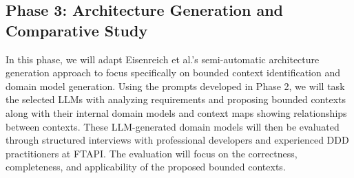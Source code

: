 \documentclass[12pt,a4paper]{article}
\begin{document}
\subsection{Phase 3: Architecture Generation and Comparative Study}
In this phase, we will adapt Eisenreich et al.'s semi-automatic architecture generation approach to focus specifically on bounded context identification and domain model generation. Using the prompts developed in Phase 2, we will task the selected LLMs with analyzing requirements and proposing bounded contexts along with their internal domain models and context maps showing relationships between contexts. These LLM-generated domain models will then be evaluated through structured interviews with professional developers and experienced DDD practitioners at FTAPI. The evaluation will focus on the correctness, completeness, and applicability of the proposed bounded contexts.

\printbibliography
\end{document}
